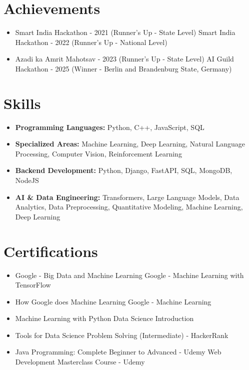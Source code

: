 \documentclass[a4paper,10pt]{article}
\begin{document}
\section*{Achievements}
\begin{itemize}
\item Smart India Hackathon - 2021 (Runner's Up - State Level) \hfill Smart India Hackathon - 2022 (Runner's Up - National Level)
\item Azadi ka Amrit Mahotsav - 2023 (Runner's Up - State Level) \hfill AI Guild Hackathon - 2025 (Winner - Berlin and Brandenburg State, Germany)
\end{itemize}

\section*{Skills}
\begin{itemize}
  \item \textbf{Programming Languages:} Python, C++, JavaScript, SQL
  \item \textbf{Specialized Areas:} Machine Learning, Deep Learning, Natural Language Processing, Computer Vision, Reinforcement Learning
  \item \textbf{Backend Development:} Python, Django, FastAPI, SQL, MongoDB, NodeJS
  \item \textbf{AI \& Data Engineering:} Transformers, Large Language Models, Data Analytics, Data Preprocessing, Quantitative Modeling, Machine Learning, Deep Learning
\end{itemize}

\section*{Certifications}
\begin{itemize}
\item Google - Big Data and Machine Learning \hfill Google - Machine Learning with TensorFlow
\item How Google does Machine Learning \hfill Google - Machine Learning
\item Machine Learning with Python \hfill Data Science Introduction
\item Tools for Data Science \hfill Problem Solving (Intermediate) - HackerRank
\item Java Programming: Complete Beginner to Advanced - Udemy \hfill Web Development Masterclass Course - Udemy
\end{itemize}
\end{document}

